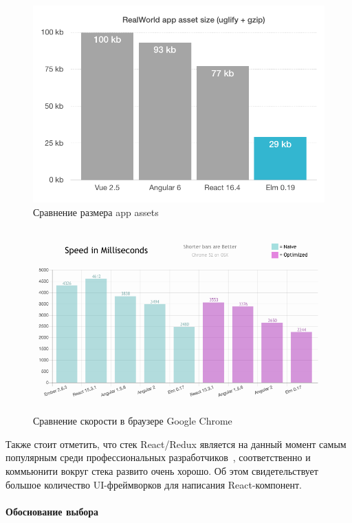 \documentclass[a4paper,12pt,reqno]{article}
\begin{document}
\begin{figure}[H]
		\centering
		\includegraphics[width = 0.8\linewidth]{img/asset-sizes.png}
		\caption{Сравнение размера app assets \cite{assets}}
		\label{assets}
\end{figure}

\begin{figure}[H]
		\centering
		\includegraphics[width = 0.9\linewidth]{img/chrome_speed.png}
		\caption{Сравнение скорости в браузере Google Chrome \cite{performance}}
		\label{performance}
\end{figure}

Также стоит отметить, что стек React/Redux является на данный момент самым популярным среди профессиональных разработчиков~\cite{cool}, соответственно и коммьюнити вокруг стека развито очень хорошо. Об этом свидетельствует большое количество UI-фреймворков для написания React-компонент. 

\paragraph*{Обоснование выбора\\}
\end{document}
